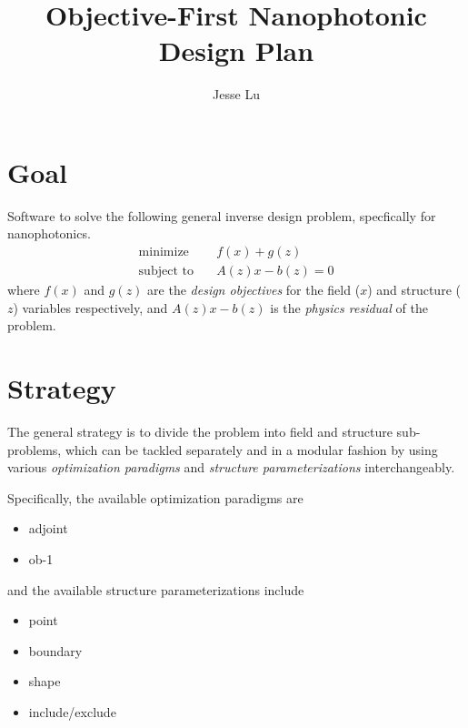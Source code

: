 \documentclass{article}
\title{Objective-First Nanophotonic Design Plan}
\author{Jesse Lu}
\newcommand{\E}[2]{\begin{subequations}\begin{align}#1\end{align}\label{eq:#2}\end{subequations}}
\DeclareMathOperator*{\minimize}{\text{minimize}\quad}
\newcommand{\subto}{\text{subject to}\quad}
\newcommand{\BI}{\begin{itemize}\item}
\newcommand{\EI}{\end{itemize}}
\newcommand{\I}{\item}
\begin{document}
\maketitle
\tableofcontents

\section{Goal}
    Software to solve the following general inverse design problem, specfically for nanophotonics.
    \E{ \minimize&  f(x) + g(z) \\
        \subto&     A(z)x - b(z) = 0}{prob}
    where $f(x)$ and $g(z)$ are the \emph{design objectives} for the field ($x$) and structure ($z$) variables respectively,
    and $A(z)x - b(z)$ is the \emph{physics residual} of the problem.

\section{Strategy}
    The general strategy is to divide the problem 
        into field and structure sub-problems,
        which can be tackled separately and in a modular fashion
        by using various
        \emph{optimization paradigms} and 
        \emph{structure parameterizations}
        interchangeably.

    Specifically, the available optimization paradigms are
    \BI adjoint
    \I  ob-1    \EI
    and the available structure parameterizations include
    \BI point
    \I  boundary
    \I  shape
    \I  include/exclude \EI
\end{document}
